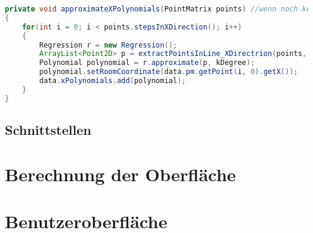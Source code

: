 \documentclass[11pt, bibliography=totocnumbered]{scrartcl}
\begin{document}
\begin{lstlisting}[caption={Polynome mit x als Raumkoordinate}, label={lst:label}, language=Java]
private void approximateXPolynomials(PointMatrix points) //wenn noch keine Stützpunkte vorhanden sind
{
	for(int i = 0; i < points.stepsInXDirection(); i++)
	{
		Regression r = new Regression();
		ArrayList<Point2D> p = extractPointsInLine_XDirectrion(points, i);
		Polynomial polynomial = r.approximate(p, kDegree);
		polynomial.setRoomCoordinate(data.pm.getPoint(i, 0).getX());
		data.xPolynomials.add(polynomial);
	}
}
\end{lstlisting}


\subsection{Schnittstellen}

\section{Berechnung der Oberfl\"ache}

\section{Benutzeroberfl\"ache}
\end{document}
